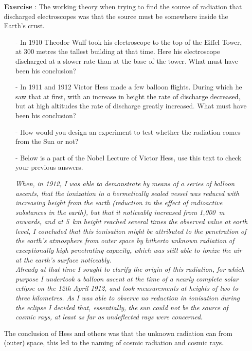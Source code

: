 \begin{shaded}
\textbf{Exercise \theExercise {}} : The working theory when trying to find the source of radiation that discharged electroscopes was that the source must be somewhere inside the Earth's crust.
\begin{itemize}
\item[-] In 1910 Theodor Wulf took his electroscope to the top of the Eiffel Tower, at 300 metres the tallest building at that time. Here his electroscope discharged at a slower rate than at the base of the tower. What must have been his conclusion?
\item[-] In 1911 and 1912 Victor Hess made a few balloon flights. During which he saw that at first, with an increase in height the rate of discharge decreased, but at high altitudes the rate of discharge greatly increased. What must have been his conclusion? 
\item[-] How would you design an experiment to test whether the radiation comes from the Sun or not?
\item[-] Below is a part of the Nobel Lecture of Victor Hess, use this text to 	check your previous answers.

\textit{When, in 1912, I was able to demonstrate by means of a series of balloon ascents, that the ionization in a hermetically sealed vessel was reduced with increasing height from the earth (reduction in the effect of radioactive substances in the earth), but that it noticeably increased from 1,000~m onwards, and at 5~km height reached several times the observed value at earth level, I concluded that this ionisation might be attributed to the penetration of the earth's atmosphere from outer space by hitherto unknown radiation of exceptionally high penetrating capacity, which was still able to ionize the air at the earth's surface noticeably. \\
Already at that time I sought to clarify the origin of this radiation, for which purpose I undertook a balloon ascent at the time of a nearly complete solar eclipse on the 12th April 1912, and took measurements at heights of two to three kilometres. As I was able to observe no reduction in ionisation during the eclipse I decided that, essentially, the sun could not be the source of cosmic rays, at least as far as undeflected rays were concerned.}
\end{itemize} \end{shaded}

The conclusion of Hess and others was that the unknown radiation can from (outer) space, this led to the naming of cosmic radiation and cosmic rays.

